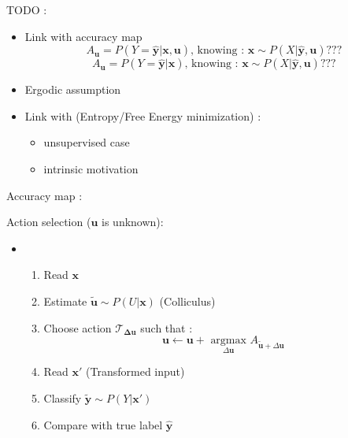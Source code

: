 TODO :
\begin{itemize}
	\item Link with accuracy map $$A_{\boldsymbol{u}} = P(Y = \hat{\boldsymbol{y}}|\boldsymbol{x}, \boldsymbol{u})
	\text{,  knowing  : }
	\boldsymbol{x} \sim P(X|\hat{\boldsymbol{y}}, \boldsymbol{u})??? $$
	$$A_{\boldsymbol{u}} = P(Y = \hat{\boldsymbol{y}}|\boldsymbol{x})
	\text{,  knowing  : }
	\boldsymbol{x} \sim P(X|\hat{\boldsymbol{y}}, \boldsymbol{u}) ???$$
	\item Ergodic assumption
	\item Link with (Entropy/Free Energy minimization) :
	\begin{itemize}
		\item unsupervised case
		\item intrinsic motivation
	\end{itemize}
\end{itemize}

Accuracy map : 


Action selection ($\boldsymbol{u}$ is unknown):
\begin{itemize}
	\item 
	
	\begin{enumerate}
		\item Read $\boldsymbol{x}$
		\item Estimate $\tilde{\boldsymbol{u}} \sim P(U|\boldsymbol{x})$ (Colliculus)
		\item Choose action $\mathcal{T}_{\boldsymbol{\Delta u}}$ such that :
		$$\boldsymbol{u} \leftarrow \boldsymbol{u} + \underset{\Delta\boldsymbol{u}} {\text{ argmax }}
		A_{\tilde{\boldsymbol{u}} + \Delta\boldsymbol{u}}$$
		\item Read $\boldsymbol{x}'$ (Transformed input)
		\item Classify $\tilde{\boldsymbol{y}} \sim P(Y|\boldsymbol{x}')$
		\item Compare with true label $\hat{\boldsymbol{y}}$
	\end{enumerate}
\end{itemize}

